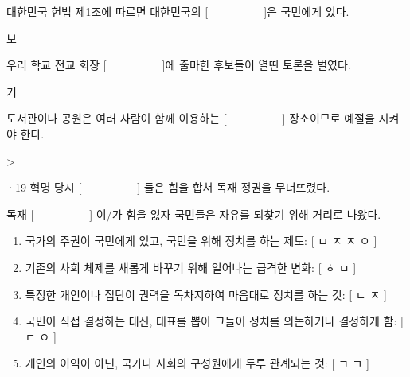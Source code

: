 \documentclass[fs95,seriesFre]{korfarm-base}
\begin{document}
\kfActivityBg \par{}\par\nopagebreak[4]\smallskip\nopagebreak[4]
\begin{kfBlankList}
\kfBlankItem 대한민국 헌법 제1조에 따르면 대한민국의 [　　　　　]은 국민에게 있다.
\begin{kfEvidence}보\end{kfEvidence}
\kfBlankItem 우리 학교 전교 회장 [　　　　　]에 출마한 후보들이 열띤 토론을 벌였다.
\begin{kfEvidence}기\end{kfEvidence}
\kfBlankItem 도서관이나 공원은 여러 사람이 함께 이용하는 [　　　　　] 장소이므로 예절을 지켜야 한다.
\begin{kfEvidence}>\end{kfEvidence}
·19 혁명 당시 [　　　　　] 들은 힘을 합쳐 독재 정권을 무너뜨렸다.
\begin{kfEvidence}\end{kfEvidence}
\kfBlankItem 독재 [　　　　　] 이/가 힘을 잃자 국민들은 자유를 되찾기 위해 거리로 나왔다.
\begin{kfEvidence}\end{kfEvidence}
\end{kfBlankList}

\kfActivityBg \par{}\par\nopagebreak[4]\smallskip\nopagebreak[4]
\begin{kfConnect}
\end{kfConnect}

\kfActivityBg \par{}\par\nopagebreak[4]\smallskip\nopagebreak[4]
\begin{enumerate}[leftmargin=22pt, itemsep=6pt, topsep=4pt, label=\textbf{\arabic*.}]
\item 국가의 주권이 국민에게 있고, 국민을 위해 정치를 하는 제도: [  ㅁ  ㅈ  ㅈ  ㅇ  ]
\item 기존의 사회 체제를 새롭게 바꾸기 위해 일어나는 급격한 변화: [  ㅎ  ㅁ  ]
\item 특정한 개인이나 집단이 권력을 독차지하여 마음대로 정치를 하는 것: [  ㄷ  ㅈ  ]
\item 국민이 직접 결정하는 대신, 대표를 뽑아 그들이 정치를 의논하거나 결정하게 함: [  ㄷ  ㅇ  ]
\item 개인의 이익이 아닌, 국가나 사회의 구성원에게 두루 관계되는 것: [  ㄱ  ㄱ  ]
\end{enumerate}
\end{document}
